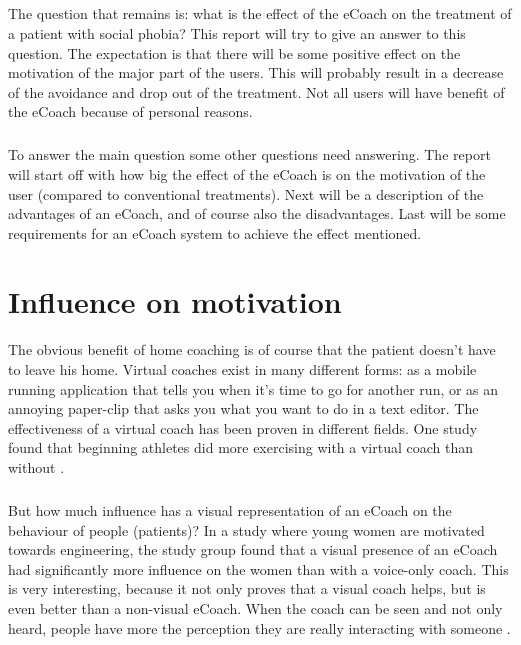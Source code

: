 \documentclass[english,a4paper,pdftex]{report}
\begin{document}
\paragraph{}
The question that remains is: what is the effect of the eCoach on the treatment of a patient with social phobia? This report will try to give an answer to this question. The expectation is that there will be some positive effect on the motivation of the major part of the users. This will probably result in a decrease of the avoidance and drop out of the treatment. Not all users will have benefit of the eCoach because of personal reasons.
\paragraph{}
To answer the main question some other questions need answering. The report will start off with how big the effect of the eCoach is on the motivation of the user (compared to conventional treatments). Next will be a description of the advantages of an eCoach, and of course also the disadvantages. Last will be some requirements for an eCoach system to achieve the effect mentioned.




\chapter{Influence on motivation}
The obvious benefit of home coaching is of course that the patient doesn't have to leave his home. Virtual coaches exist in many different forms: as a mobile running application that tells you when it's time to go for another run, or as an annoying paper-clip that asks you what you want to do in a text editor.  The effectiveness of a virtual coach has been proven in different fields. One study found that beginning athletes did more exercising with a virtual coach than without \cite{eyck2006effect}. 
\paragraph{}
But how much influence has a visual representation of an eCoach on the behaviour of people (patients)? In a study \cite{rosenberg2007importance} where young women are motivated towards engineering, the study group found that a visual presence of an eCoach had significantly more influence on the women than with a voice-only coach. This is very interesting, because it not only proves that a visual coach helps, but is even better than a non-visual eCoach. When the coach can be seen and not only heard, people have more the perception they are really interacting with someone \cite{baylor2009promoting}. 
\end{document}
